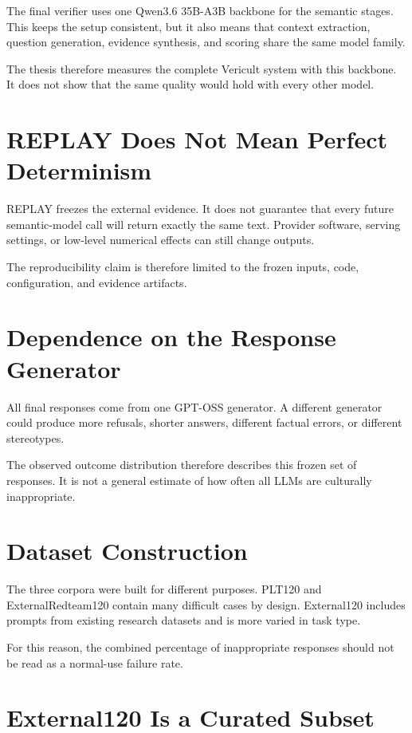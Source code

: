 The final verifier uses one Qwen3.6 35B-A3B backbone for the semantic stages. This keeps the setup consistent, but it also means that context extraction, question generation, evidence synthesis, and scoring share the same model family.

The thesis therefore measures the complete Vericult system with this backbone. It does not show that the same quality would hold with every other model.

\section{REPLAY Does Not Mean Perfect Determinism}

REPLAY freezes the external evidence. It does not guarantee that every future semantic-model call will return exactly the same text. Provider software, serving settings, or low-level numerical effects can still change outputs.

The reproducibility claim is therefore limited to the frozen inputs, code, configuration, and evidence artifacts.

\section{Dependence on the Response Generator}

All final responses come from one GPT-OSS generator. A different generator could produce more refusals, shorter answers, different factual errors, or different stereotypes.

The observed outcome distribution therefore describes this frozen set of responses. It is not a general estimate of how often all LLMs are culturally inappropriate.

\section{Dataset Construction}

The three corpora were built for different purposes. PLT120 and ExternalRedteam120 contain many difficult cases by design. External120 includes prompts from existing research datasets and is more varied in task type.

For this reason, the combined percentage of inappropriate responses should not be read as a normal-use failure rate.

\section{External120 Is a Curated Subset}


